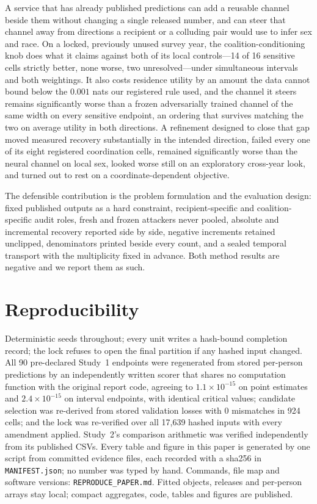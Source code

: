\documentclass[10pt]{article}
\begin{document}
A service that has already published predictions can add a reusable channel beside them without
changing a single released number, and can steer that channel away from directions a recipient or a
colluding pair would use to infer sex and race. On a locked, previously unused survey year, the
coalition-conditioning knob does what it claims against both of its local controls---14 of 16
sensitive cells strictly better, none worse, two unresolved---under simultaneous intervals and both
weightings. It also costs residence utility by an amount the data cannot bound below the $0.001$
nats our registered rule used, and the channel it steers remains significantly worse than a frozen
adversarially trained channel of the same width on every sensitive endpoint, an ordering that
survives matching the two on average utility in both directions. A refinement designed to close
that gap moved measured recovery substantially in the intended direction, failed every one of its
eight registered coordination cells, remained significantly worse than the neural channel on local
sex, looked worse still on an exploratory cross-year look, and turned out to rest on a
coordinate-dependent objective.

The defensible contribution is the problem formulation and the evaluation design: fixed published
outputs as a hard constraint, recipient-specific and coalition-specific audit roles, fresh and
frozen attackers never pooled, absolute and incremental recovery reported side by side, negative
increments retained unclipped, denominators printed beside every count, and a sealed temporal
transport with the multiplicity fixed in advance. Both method results are negative and we report
them as such.

\section{Reproducibility}
\label{sec:repro}

Deterministic seeds throughout; every unit writes a hash-bound completion record; the lock refuses
to open the final partition if any hashed input changed. All 90 pre-declared Study~1 endpoints were
regenerated from stored per-person predictions by an independently written scorer that shares no
computation function with the original report code, agreeing to $1.1\times10^{-15}$ on point
estimates and $2.4\times10^{-15}$ on interval endpoints, with identical critical values; candidate
selection was re-derived from stored validation losses with 0 mismatches in 924 cells; and the lock
was re-verified over all 17{,}639 hashed inputs with every amendment applied. Study~2's comparison
arithmetic was verified independently from its published CSVs. Every table and figure in this paper
is generated by one script from committed evidence files, each recorded with a sha256 in
\texttt{MANIFEST.json}; no number was typed by hand. Commands, file map and software versions:
\texttt{REPRODUCE\_PAPER.md}. Fitted objects, releases and per-person arrays stay local; compact
aggregates, code, tables and figures are published.
\end{document}
